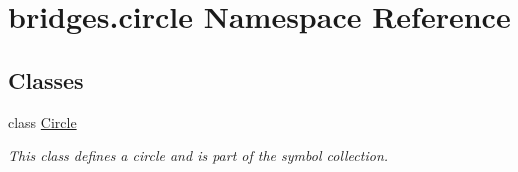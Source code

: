 \hypertarget{namespacebridges_1_1circle}{}\section{bridges.\+circle Namespace Reference}
\label{namespacebridges_1_1circle}
\subsection*{Classes}
\begin{DoxyCompactItemize}
\item 
class \mbox{\hyperlink{classbridges_1_1circle_1_1_circle}{Circle}}
\begin{DoxyCompactList}\small\item\em This class defines a circle and is part of the symbol collection. \end{DoxyCompactList}\end{DoxyCompactItemize}
